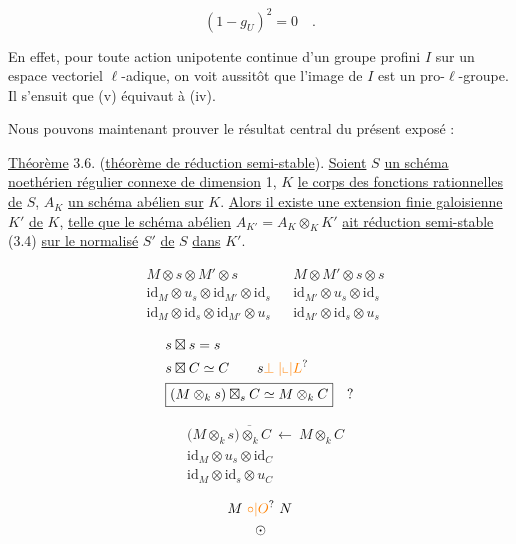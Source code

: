 \[
(1-g_U)^2=0\quad.\tag*{(3.5.3)}
\]

En effet, pour toute action unipotente continue d'un groupe profini $I$ sur un espace vectoriel $\ell$-adique, on voit aussitôt que l'image de $I$ est un pro-$\ell$-groupe. Il s'ensuit que (v) équivaut à (iv).

Nous pouvons maintenant prouver le résultat central du présent exposé :

\uline{Théorème} 3.6. (\uline{théorème de réduction semi-stable}). \uline{Soient} $S$ \uline{un schéma noethérien régulier connexe de dimension} 1, $K$ \uline{le corps des fonctions rationnelles de} $S$, $A_K$ \uline{un schéma abélien sur} $K$. \uline{Alors il existe une extension finie galoisienne} $K'$ \uline{de} $K$, \uline{telle que le schéma abélien} $A_{K'}=A_K\otimes_K K'$ \uline{ait réduction semi-stable} (3.4) \uline{sur le normalisé} $S'$ \uline{de} $S$ \uline{dans} $K'$.

\[
\begin{aligned}
&M\otimes s\otimes M'\otimes s&&M\otimes M'\otimes s\otimes s\\
&\mathrm{id}_M\otimes u_s\otimes\mathrm{id}_{M'}\otimes\mathrm{id}_s
 &&\mathrm{id}_{M'}\otimes u_s\otimes\mathrm{id}_s\\
&\mathrm{id}_M\otimes\mathrm{id}_s\otimes\mathrm{id}_{M'}\otimes u_s
 &&\mathrm{id}_{M'}\otimes\mathrm{id}_s\otimes u_s
\end{aligned}
\]

\[
\begin{aligned}
&s\boxtimes s=s\\
&s\boxtimes C\simeq C\qquad s\mathbin{\unsure{\perp|{\llcorner}|L}}\\
&\boxed{(M\otimes_k s)\boxtimes_s C\simeq M\otimes_k C}\quad?
\end{aligned}
\]

\[
\begin{aligned}
&\bigl(M\otimes_k\overline{s)\otimes_k C}\ \longleftarrow\ M\otimes_k C\\
&\mathrm{id}_M\otimes u_s\otimes\mathrm{id}_C\\
&\mathrm{id}_M\otimes\mathrm{id}_s\otimes u_C
\end{aligned}
\]

\[
\begin{aligned}
&M\ \unsure{\circ|O}\ N\\
&\qquad\odot
\end{aligned}
\]

